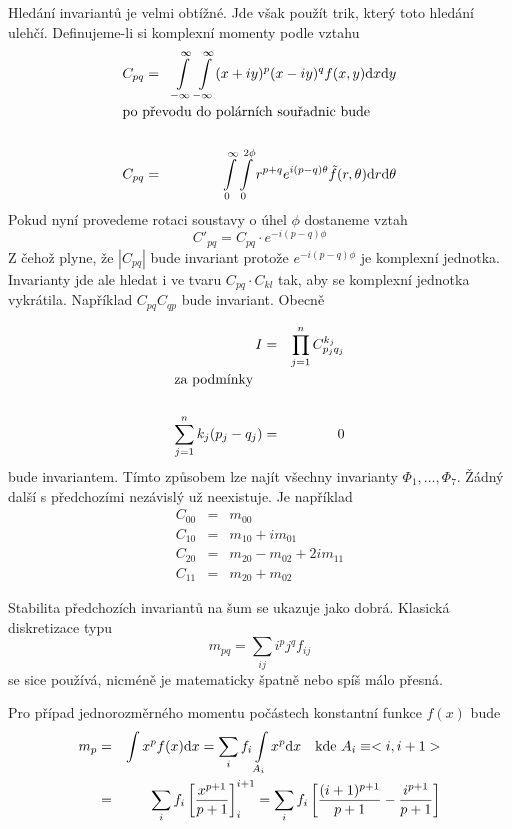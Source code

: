 Hledání invariantů je velmi obtížné. Jde však použít trik, který toto hledání ulehčí.
Definujeme-li si komplexní momenty podle vztahu
\begin{eqnarray}
C_{pq}&=&\int\limits_{-\infty}^\infty\int\limits_{-\infty}^\infty(x+iy)^p(x-iy)^q f(x,y)\d x\d y\\
\noalign{\hbox{po převodu do polárních souřadnic bude}\nonumber}\\
C_{pq}&=&\int\limits_0^\infty\int\limits_0^{2\phi}r^{p+q}e^{i(p-q)\theta}\tilde{f}(r,\theta)\d r\d \theta
\end{eqnarray}
\noindent Pokud nyní provedeme rotaci soustavy o úhel $\phi$ dostaneme vztah
\begin{equation}
{C'}_{pq}=C_{pq}\cdot e^{-i(p-q)\phi}
\end{equation}
\noindent Z čehož plyne, že $|C_{pq}|$ bude invariant protože $e^{-i(p-q)\phi}$ je komplexní jednotka.
Invarianty jde ale hledat i ve tvaru $C_{pq}\cdot C_{kl}$ tak, aby se komplexní jednotka vykrátila.
Například $C_{pq}C_{qp}$ bude invariant. Obecně

\begin{eqnarray}
I&=&\prod\limits_{j=1}^nC_{p_jq_j}^{k_j}\\
\noalign{\hbox{za podmínky}\nonumber}\\
\sum\limits_{j=1}^nk_j(p_j-q_j)&=&0
\end{eqnarray}
\noindent bude invariantem. Tímto způsobem lze najít všechny invarianty $\Phi_1,\dots,\Phi_7$.
Žádný další s předchozími nezávislý už neexistuje. Je například
\begin{eqnarray}
C_{00}&=&m_{00}\\
C_{10}&=&m_{10}+im_{01}\\
C_{20}&=&m_{20}-m_{02}+2im_{11}\\
C_{11}&=&m_{20}+m_{02}
\end{eqnarray}

Stabilita předchozích invariantů na šum se ukazuje jako dobrá. 
Klasická diskretizace typu 
\begin{equation}
m_{pq}=\sum\limits_{ij}i^pj^qf_{ij}
\end{equation}
\noindent se sice používá, nicméně je
matematicky špatně nebo spíš málo přesná.

Pro případ jednorozměrného momentu počástech konstantní funkce $f(x)$ bude
\begin{eqnarray}
m_p&=&\int x^p f(x){\rm d} x=\sum\limits_{i}f_i\int\limits_{A_i}x^p{\rm d} x\quad\hbox{kde $A_i\equiv<i,i+1>$}\\
&=&\sum\limits_{i}f_i\left[\frac{x^{p+1}}{p+1}\right]^{i+1}_i=\sum\limits_{i}f_i
\left[\frac{(i+1)^{p+1}}{p+1}-\frac{i^{p+1}}{p+1}\right]
\end{eqnarray}

